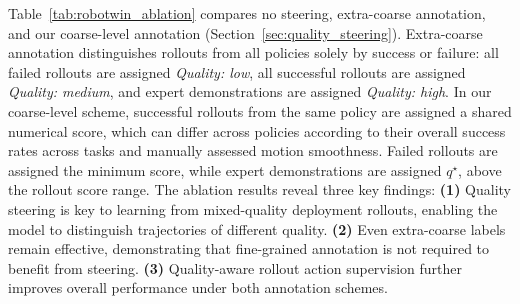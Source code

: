 

Table~\ref{tab:robotwin_ablation} compares no steering, extra-coarse annotation, and our coarse-level annotation (Section~\ref{sec:quality_steering}).
Extra-coarse annotation distinguishes rollouts from all policies solely by success or failure: all failed rollouts are assigned \textit{Quality: low}, all successful rollouts are assigned \textit{Quality: medium}, and expert demonstrations are assigned \textit{Quality: high}.
In our coarse-level scheme, successful rollouts from the same policy are assigned a shared numerical score, which can differ across policies according to their overall success rates across tasks and manually assessed motion smoothness.
Failed rollouts are assigned the minimum score, while expert demonstrations are assigned $q^\star$, above the rollout score range. The ablation results reveal three key findings: 
\textbf{(1)} Quality steering is key to learning from mixed-quality deployment rollouts, enabling the model to distinguish trajectories of different quality.
\textbf{(2)} Even extra-coarse labels remain effective, demonstrating that fine-grained annotation is not required to benefit from steering.
\textbf{(3)} Quality-aware rollout action supervision further improves overall performance under both annotation schemes.

